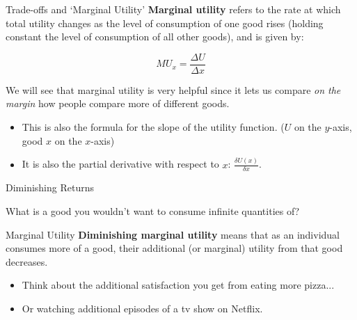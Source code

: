 \documentclass{beamer}
\begin{document}
\begin{frame}{Trade-offs and `Marginal Utility'}
  \textbf{Marginal utility} refers to the rate at which total utility changes as the level of consumption of one good rises (holding constant the level of consumption of all other goods), and is given by:

  $$ 
    MU_x = \frac{\Delta U}{\Delta	x}
  $$ 
  
  We will see that marginal utility is very helpful since it lets us compare \emph{on the margin} how people compare more of different goods.

  \begin{itemize}
    \item This is also the formula for the slope of the utility function. ($U$ on the $y$-axis, good $x$ on the $x$-axis)
    \item It is also the partial derivative with respect to $x$: $\frac{\delta U(x)}{\delta x}$.
  \end{itemize}
\end{frame}

\begin{frame}[c]{Diminishing Returns}
  \begin{center}
    What is a good you wouldn't want to consume infinite quantities of?
  \end{center}
\end{frame}

\begin{frame}{Marginal Utility}
  \textbf{Diminishing marginal utility} means that as an individual consumes more of a good, their additional (or marginal) utility from that good decreases.

  \begin{itemize}
    \item Think about the additional satisfaction you get from eating more pizza...

    \item Or watching additional episodes of a tv show on Netflix.

  \end{itemize}
\end{frame}
\end{document}

